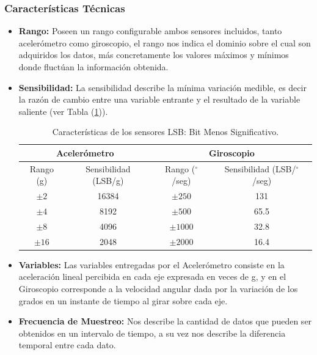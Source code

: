 \documentclass[12pt,a4paper]{article}
\newcommand{\grad}{$^{\circ}$}
\begin{document}
\newpage
\subsubsection{Características Técnicas}

\begin{itemize}
	
	\item \textbf{Rango:} Poseen un rango configurable ambos sensores incluidos, tanto acelerómetro como giroscopio, el rango nos indica el dominio sobre el cual son adquiridos los datos, más concretamente los valores máximos y mínimos donde fluctúan la información obtenida.
	
	\item \textbf{Sensibilidad:} La sensibilidad describe la mínima variación medible, es decir la razón de cambio entre una variable entrante y el resultado de la variable saliente (ver Tabla (\ref{table:caracteristicasSensor})).
	
	\begin{table}[H]
		\centering
		\begin{tabular}{|c|c|c|c|}
			\hline
			\multicolumn{2}{|c|}{Acelerómetro} &\multicolumn{2}{|c|}{Giroscopio}   \\
			\hline
			Rango (g)        & Sensibilidad (LSB/g)  & Rango (\grad/seg)     & Sensibilidad (LSB/\grad/seg)\\ \hline
			$\pm 2$     &  16384 & $\pm 250 $  	& 	131      	\\ 
			$\pm 4$     &  8192  & $\pm 500 $ 	& 	65.5     	\\
			$\pm 8$     &  4096  & $\pm 1000$  	& 	32.8       	\\
			$\pm 16$    &  2048  & $\pm 2000$   & 	16.4      	\\ 
			\hline
		\end{tabular}
		\caption{Características de los sensores LSB: Bit Menos Significativo.}
		\label{table:caracteristicasSensor}
	\end{table}
	
	\item \textbf{Variables:} Las variables entregadas por el Acelerómetro consiste en la aceleración lineal percibida en cada eje expresada en veces de g, y en el Giroscopio corresponde  a la velocidad angular dada por la variación de los grados en un instante de tiempo al girar sobre cada eje.
	
	\item \textbf{Frecuencia de Muestreo:} Nos describe la cantidad de datos que pueden ser obtenidos en un intervalo de tiempo, a su vez nos describe la diferencia temporal entre cada dato.
	

\end{itemize}
\end{document}
